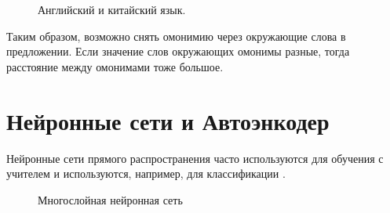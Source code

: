 \documentclass[12pt]{article}
\begin{document}
 	\begin{figure}[H]
		\noindent{}
		\caption{Английский и китайский язык.}
		\label{figCurves}
	\end{figure}

	

Таким образом, возможно снять омонимию через окружающие слова в предложении. Если значение слов окружающих омонимы разные, тогда расстояние между омонимами тоже большое.

\section{Нейронные сети и Автоэнкодер}

Нейронные сети прямого распространения часто используются для обучения с учителем и используются, например, для классификации \cite{Stanford1}.

  \begin{figure}[H]
    \noindent{}
    \caption{Многослойная нейронная сеть}
    \label{figCurves}
  \end{figure}
\end{document}
